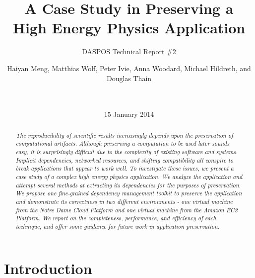 \documentclass{sig-alternate}
\begin{document}
\title{A Case Study in Preserving a\\High Energy Physics Application}
\subtitle{DASPOS Technical Report \#2}
\author{
Haiyan Meng, Matthias Wolf, Peter Ivie, Anna Woodard, Michael Hildreth, and Douglas Thain\\
\\
\\
}
\date{15 January 2014}
\maketitle

\begin{abstract}
\it The reproducibility of scientific results increasingly
depends upon the preservation of computational artifacts.
Although preserving a computation to be used later sounds
easy, it is surprisingly difficult due to the complexity
of existing software and systems.  Implicit dependencies,
networked resources, and shifting compatibility all conspire
to break applications that appear to work well.  To investigate
these issues, we present a case study of a complex high energy
physics application.  We analyze the application and attempt
several methods at extracting its dependencies for the purposes
of preservation. 
We propose one fine-grained dependency management toolkit to preserve the application and demonstrate its correctness in two different environments - one virtual machine from the Notre Dame Cloud Platform and one virtual machine from the Amazon EC2 Platform. 
We report on the completeness, performance,
and efficiency of each technique, and offer some guidance for
future work in application preservation.
\end{abstract}



\section{Introduction}
\end{document}
